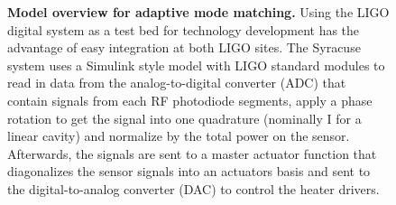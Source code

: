 \begin{figure}[h]
		\centering
		\caption[Model overview for adaptive mode matching.]
		{\textbf{Model overview for adaptive mode matching.} 
		Using the LIGO digital system as a test bed for technology development has the advantage of easy integration at both LIGO sites.  The Syracuse system uses a Simulink style model with LIGO standard modules to read in data from the analog-to-digital converter (ADC) that contain signals from each RF photodiode segments, apply a phase rotation to get the signal into one quadrature (nominally I for a linear cavity) and normalize by the total power on the sensor.  Afterwards, the signals are sent to a master actuator function that diagonalizes the sensor signals into an actuators basis and sent to the digital-to-analog converter (DAC) to control the heater drivers.
		}
		\label{fig:AMM_overview}
\end{figure}


